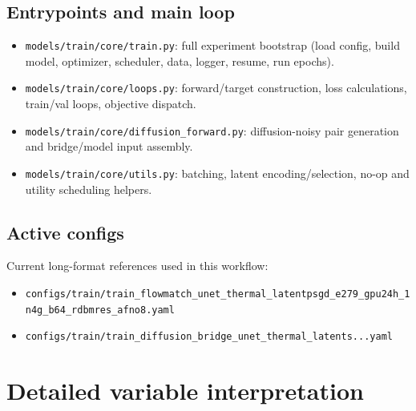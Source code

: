 \documentclass[11pt]{article}
\begin{document}
\subsection{Entrypoints and main loop}
\begin{itemize}
  \item \texttt{models/train/core/train.py}: full experiment bootstrap (load config, build model, optimizer, scheduler, data, logger, resume, run epochs).
  \item \texttt{models/train/core/loops.py}: forward/target construction, loss calculations, train/val loops, objective dispatch.
  \item \texttt{models/train/core/diffusion\_forward.py}: diffusion-noisy pair generation and bridge/model input assembly.
  \item \texttt{models/train/core/utils.py}: batching, latent encoding/selection, no-op and utility scheduling helpers.
\end{itemize}

\subsection{Active configs}
Current long-format references used in this workflow:
\begin{itemize}
  \item \texttt{configs/train/train\_flowmatch\_unet\_thermal\_latentpsgd\_e279\_gpu24h\_1n4g\_b64\_rdbmres\_afno8.yaml}
  \item \texttt{configs/train/train\_diffusion\_bridge\_unet\_thermal\_latents...yaml}
\end{itemize}

\section{Detailed variable interpretation}
\end{document}
